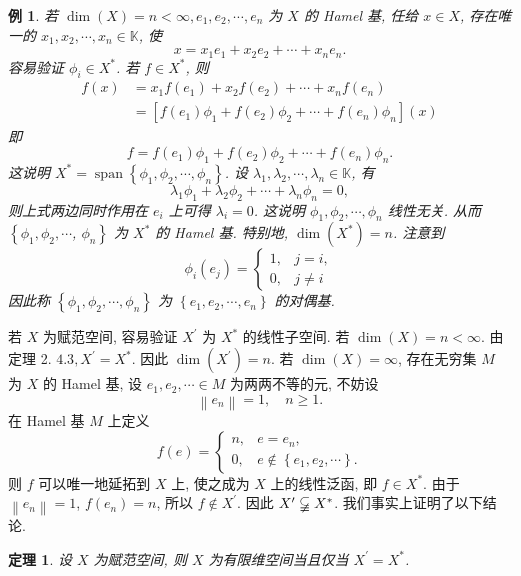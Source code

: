 \documentclass[openany]{ctexbook}
\theoremstyle{kaiti}
\newtheorem{theorem}{定理}[section]
\theoremstyle{normal}
\newtheorem{example}{例}[section]
\begin{document}
\begin{example}
若 $\operatorname{dim}(X)=n<\infty, e_1, e_2, \cdots, e_n$ 为 $X$ 的 Hamel 基, 任给 $x \in X$, 存在唯一的 $x_1, x_2, \cdots, x_n \in \mathbb{K}$, 使
$$
x=x_1 e_1+x_2 e_2+\cdots+x_n e_n.
$$
容易验证 $\phi_{i} \in X^{*}$. 若 $f \in X^{*}$, 则
$$
\begin{aligned}
f(x) &=x_1 f\left(e_1\right)+x_2 f\left(e_2\right)+\cdots+x_n f\left(e_n\right) \\
&=\left[f\left(e_1\right) \phi_1+f\left(e_2\right) \phi_2+\cdots+f\left(e_n\right) \phi_n\right](x)
\end{aligned}
$$
即
$$
f=f\left(e_1\right) \phi_1+f\left(e_2\right) \phi_2+\cdots+f\left(e_n\right) \phi_n.
$$
这说明 $X^{*}=\operatorname{span}\left\{\phi_1, \phi_2, \cdots, \phi_n\right\}$. 设 $\lambda_1, \lambda_2, \cdots, \lambda_n \in \mathbb{K}$, 有
$$
\lambda_1 \phi_1+\lambda_2 \phi_2+\cdots+\lambda_n \phi_n=0,
$$
则上式两边同时作用在 $e_{i}$ 上可得 $\lambda_{i}=0$. 这说明 $\phi_1, \phi_2, \cdots, \phi_n$ 线性无关. 从而 $\left\{\phi_1, \phi_2, \cdots\right.$, $\left.\phi_n\right\}$ 为 $X^{*}$ 的 Hamel 基. 特别地, $\operatorname{dim}\left(X^{*}\right)=n$. 注意到
$$
\phi_{i}\left(e_{j}\right)= \begin{cases}1, & j=i, \\ 0, & j \neq i\end{cases}
$$
因此称 $\left\{\phi_1, \phi_2, \cdots, \phi_n\right\}$ 为 $\left\{e_1, e_2, \cdots, e_n\right\}$ 的对偶基.
\end{example}

若 $X$ 为赋范空间, 容易验证 $X^{\prime}$ 为 $X^{*}$ 的线性子空间. 若 $\operatorname{dim}(X)=n<\infty$. 由定理 2. $4.3, X^{\prime}=X^{*}$. 因此 $\operatorname{dim}\left(X^{\prime}\right)=n$. 若 $\operatorname{dim}(X)=\infty$, 存在无穷集 $M$ 为 $X$ 的 Hamel 基, 设 $e_1, e_2, \cdots \in M$ 为两两不等的元, 不妨设
$$
\left\|e_n\right\|=1, \quad n \geqslant 1.
$$
在 Hamel 基 $M$ 上定义
$$
f(e)= \begin{cases}n, & e=e_n, \\ 0, & e \notin\left\{e_1, e_2, \cdots\right\}.\end{cases}
$$
则 $f$ 可以唯一地延拓到 $X$ 上, 使之成为 $X$ 上的线性泛函, 即 $f \in X^{*}$. 由于 $\left\|e_n\right\|=1$, $f\left(e_n\right)=n$, 所以 $f \notin X^{\prime}$. 因此 $X^{\prime} \varsubsetneqq X^{*}$. 我们事实上证明了以下结论.

\begin{theorem}
设 $X$ 为赋范空间, 则 $X$ 为有限维空间当且仅当 $X^{\prime}=X^{*}$.
\end{theorem}
\end{document}
